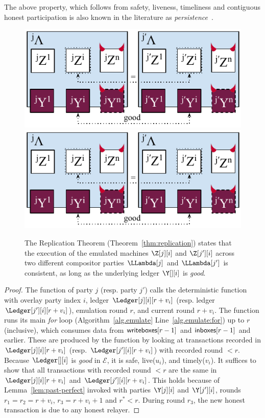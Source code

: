 The above property, which follows from safety, liveness, timeliness and
contiguous honest participation is also known in the literature as
\emph{persistence}~\cite{backbone}.

\begin{figure}
  \centering
  \iftwocolumn
  \includegraphics[width=0.7 \columnwidth,keepaspectratio]{figures/rollerblade-cross-party.pdf}
  \else
  \includegraphics[width=0.6 \columnwidth,keepaspectratio]{figures/rollerblade-cross-party.pdf}
  \fi
  \caption{The Replication Theorem (Theorem~\ref{thm:replication}) states that
  the execution of the emulated machines $\Z[j][i]$ and $\Z[j'][i]$
  across two different compositor parties $\LLambda[j]$ and $\LLambda[j']$
  is consistent, as long as the underlying ledger $\Y[][i]$ is \emph{good}.}
  \label{fig.cross-party}
\end{figure}

\begin{proof}
  The function \emulationSnapshot of party $j$ (resp. party $j'$)
  calls the deterministic function \emulate with overlay party index $i$,
  ledger $\Ledger[j][i][r + v_i]$ (resp. ledger $\Ledger[j'][i][r + v_i]$), emulation round
  $r$, and current round $r + v_i$. The function \emulate runs its main
  \emph{for} loop (Algorithm~\ref{alg.emulate} Line~\ref{alg.emulate:for})
  up to $r$ (inclusive), which consumes data from $\textsf{writeboxes}[r - 1]$
  and $\textsf{inboxes}[r - 1]$ and earlier. These are produced by the function
  \prepareEmulationInputs by looking at transactions recorded in $\Ledger[j][i][r + v_i]$
  (resp. $\Ledger[j'][i][r + v_i]$) with recorded round $< r$.
  Because $\Ledger[][i]$ is \emph{good} in $\mathcal{E}$, it is safe, live($u_i$), and timely($v_i$).
  It suffices to show that all transactions with recorded round
  $< r$ are the same in $\Ledger[j][i][r + v_i]$ and $\Ledger[j'][i][r + v_i]$.
  This holds because of Lemma~\ref{lem:past-perfect} invoked with parties $\Y[j][i]$ and $\Y[j'][i]$,
  rounds $r_1 = r_2 = r + v_i$, $r_3 = r + v_i + 1$ and $r^* < r$.
  During round $r_3$, the new honest transaction is due to any honest
  relayer.\Qed
\end{proof}

